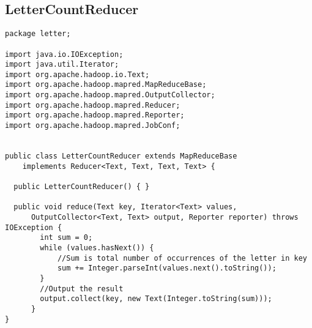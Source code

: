 \documentclass[10pt, a4paper]{article}
\begin{document}

\newpage
\subsection{LetterCountReducer} %
\label{sub:lettercountreducer}

\begin{lstlisting}
package letter;

import java.io.IOException;
import java.util.Iterator;
import org.apache.hadoop.io.Text;
import org.apache.hadoop.mapred.MapReduceBase;
import org.apache.hadoop.mapred.OutputCollector;
import org.apache.hadoop.mapred.Reducer;
import org.apache.hadoop.mapred.Reporter;
import org.apache.hadoop.mapred.JobConf;


public class LetterCountReducer extends MapReduceBase
    implements Reducer<Text, Text, Text, Text> {

  public LetterCountReducer() { }

  public void reduce(Text key, Iterator<Text> values,
      OutputCollector<Text, Text> output, Reporter reporter) throws IOException {
	  	int sum = 0;
	    while (values.hasNext()) {
	    	//Sum is total number of occurrences of the letter in key
	    	sum += Integer.parseInt(values.next().toString());
	    }
	    //Output the result
	    output.collect(key, new Text(Integer.toString(sum)));
	  }
}
\end{lstlisting}

\end{document}
